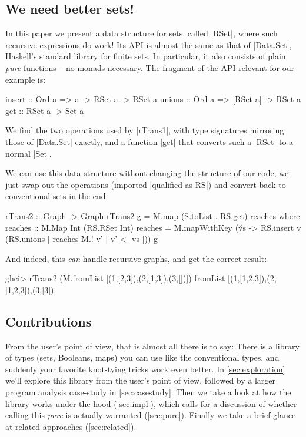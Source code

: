 \documentclass[manuscript,review,screen,acmsmall]{acmart}
\begin{document}
\subsection{We need better sets!}

In this paper we present a data structure for sets, called |RSet|, where such recursive expressions do work! Its API is almost the same as that of |Data.Set|, Haskell's standard library for finite sets. In particular, it also consists of plain \emph{pure} functions -- no monads necessary. The fragment of the API relevant for our example is:
\begin{code}
insert  :: Ord a =>  a -> RSet a  -> RSet a
unions  :: Ord a =>  [RSet a]     -> RSet a
get     ::           RSet a       -> Set a
\end{code}
We find the two operations used by |rTrans1|, with type signatures mirroring those of |Data.Set| exactly, and a function |get| that converts such a |RSet| to a normal |Set|.

We can use this data structure without changing the structure of our code; we just swap out the operations (imported |qualified as RS|) and convert back to conventional sets in the end:
\begin{code}
rTrans2 :: Graph -> Graph
rTrans2 g = M.map (S.toList . RS.get) reaches
  where
    reaches :: M.Map Int (RS.RSet Int)
    reaches = M.mapWithKey (\v vs -> RS.insert v (RS.unions [ reaches M.! v' | v' <- vs ])) g
\end{code}

And indeed, this \emph{can} handle recursive graphs, and get the correct result:
\begin{code}
ghci> rTrans2 (M.fromList [(1,[2,3]),(2,[1,3]),(3,[])])
fromList [(1,[1,2,3]),(2,[1,2,3]),(3,[3])]
\end{code}

\subsection{Contributions}

From the user’s point of view, that is almost all there is  to say: There is a library of types (sets, Booleans, maps) you can use like the conventional types, and suddenly your favorite knot-tying tricks work even better. In \cref{sec:exploration} we'll explore this library from the user's point of view, followed by a larger program analysis case-study in \cref{sec:casestudy}. Then we take a look at how the library works under the hood (\cref{sec:impl}), which calls for a discussion of whether calling this \emph{pure} is actually warranted (\cref{sec:pure}). Finally we take a brief glance at related approaches (\cref{sec:related}).
\end{document}
